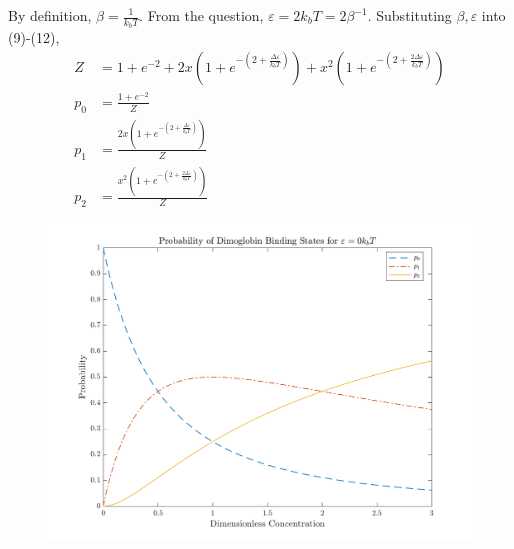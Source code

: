 By definition, $\beta=\frac{1}{k_{b}T}$. From the question, $\varepsilon=2k_{b}T=2\beta^{-1}$. Substituting $\beta,\varepsilon$ into (9)-(12), 
\begin{align}
    Z&=1+e^{-2}
    +2x(1+e^{-(2+\frac{\Delta\varepsilon}{k_{b}T})})
    +x^{2}(1+e^{-(2+\frac{2\Delta\varepsilon}{k_{b}T})})\\
    p_{0}&=\frac{1+e^{-2}}{Z}\\
    p_{1}&=\frac{2x(1+e^{-(2+\frac{\Delta\varepsilon}{k_{b}T})})}{Z}\\
    p_{2}&=\frac{x^{2}(1+e^{-(2+\frac{2\Delta\varepsilon}{k_{b}T})})}{Z}
\end{align}
  \begin{figure}[h!]
\centering
\includegraphics[height=0.46\textheight]{PHYS319_HW3_Q2_FIG0.png}
\end{figure}
